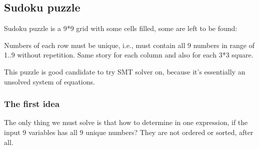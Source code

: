 \subsection{Sudoku puzzle}

Sudoku puzzle is a 9*9 grid with some cells filled, some are left to be found:


\newcommand\setrow[9]{
  \setcounter{col}{1}
  \foreach \n in {#1, #2, #3, #4, #5, #6, #7, #8, #9} {
    \edef\x{\value{col} - 0.5}
    \edef\y{9.5 - \value{row}}
    \node[anchor=center] at (\x, \y) {\n};
    \stepcounter{col}
  }
  \stepcounter{row}
}

\begin{center}
\end{center}

Numbers of each row must be unique, i.e., must contain all 9 numbers in range of 1..9 without repetition.
Same story for each column and also for each 3*3 square.

This puzzle is good candidate to try SMT solver on, because it's essentially an unsolved system of equations.

\subsubsection{The first idea}

The only thing we must solve is that how to determine in one expression, if the input 9 variables has all 9 unique numbers?
They are not ordered or sorted, after all.

